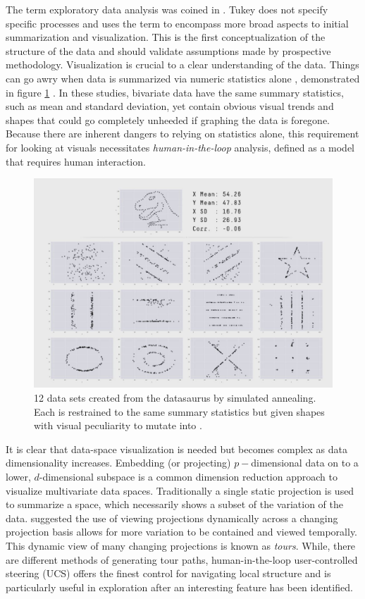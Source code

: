 \documentclass{monashthesis}
\begin{document}
The term exploratory data analysis was coined in
\textcite{tukey_exploratory_1977}. Tukey does not specify specific
processes and uses the term to encompass more broad aspects to initial
summarization and visualization. This is the first conceptualization of
the structure of the data and should validate assumptions made by
prospective methodology. Visualization is crucial to a clear
understanding of the data. Things can go awry when data is summarized
via numeric statistics alone \autocite{anscombe_graphs_1973},
demonstrated in figure \ref{fig:matejka17fig}
\autocite{matejka_same_2017}. In these studies, bivariate data have the
same summary statistics, such as mean and standard deviation, yet
contain obvious visual trends and shapes that could go completely
unheeded if graphing the data is foregone. Because there are inherent
dangers to relying on statistics alone, this requirement for looking at
visuals necessitates \emph{human-in-the-loop} analysis, defined as a
model that requires human interaction.






\begin{figure}

{\centering \includegraphics[width=0.7\linewidth]{./figures/matejka17fig} 

}

\caption{12 data sets created from the datasaurus by
simulated annealing. Each is restrained to the same summary statistics
but given shapes with visual peculiarity to mutate into
\autocite{matejka_same_2017}.}\label{fig:matejka17fig}
\end{figure}

It is clear that data-space visualization is needed but becomes complex
as data dimensionality increases. Embedding (or projecting)
\(p-\)dimensional data on to a lower, \(d\)-dimensional subspace is a
common dimension reduction approach to visualize multivariate data
spaces. Traditionally a single static projection is used to summarize a
space, which necessarily shows a subset of the variation of the data.
\textcite{asimov_grand_1985} suggested the use of viewing projections
dynamically across a changing projection basis allows for more variation
to be contained and viewed temporally. This dynamic view of many
changing projections is known as \emph{tours}. While, there are
different methods of generating tour paths, human-in-the-loop
user-controlled steering (UCS) offers the finest control for navigating
local structure and is particularly useful in exploration after an
interesting feature has been identified.
\end{document}
